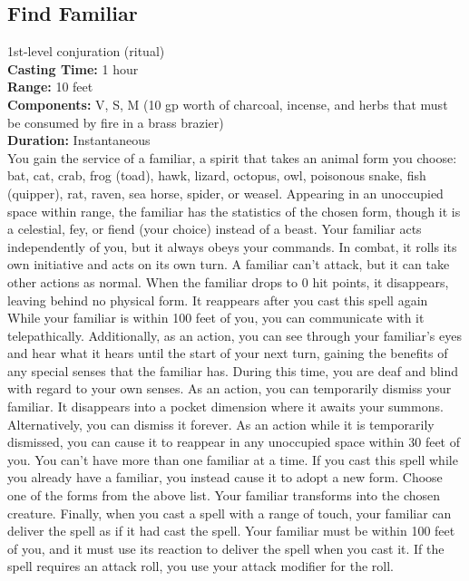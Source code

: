 \documentclass[11pt, A4paper, english]{article}
\begin{document}
		\subsection{Find Familiar}
1st-level conjuration (ritual) \\
\textbf{Casting Time:} 1 hour \\
\textbf{Range:} 10 feet \\
\textbf{Components:} V, S, M (10 gp worth of charcoal, incense, and herbs that must be consumed by fire in a brass brazier) \\
\textbf{Duration:} Instantaneous \\
You gain the service of a familiar, a spirit that takes an animal form you choose: bat, cat, crab, frog (toad), hawk, lizard, octopus, owl, poisonous snake, fish (quipper), rat, raven, sea horse, spider, or weasel. Appearing in an unoccupied space within range, the familiar has the statistics of the chosen form, though it is a celestial, fey, or fiend (your choice) instead of a beast. Your familiar acts independently of you, but it always obeys your commands. In combat, it rolls its own initiative and acts on its own turn. A familiar can’t attack, but it can take other actions as normal. When the familiar drops to 0 hit points, it disappears, leaving behind no physical form. It reappears after you cast this spell again While your familiar is within  100 feet of you, you can communicate with it telepathically. Additionally, as an action, you can see through your familiar’s eyes and hear what it hears until the start of your next turn, gaining the benefits of any special senses that the familiar has. During this time, you are deaf and blind with regard to your own senses. As an action, you can temporarily dismiss your familiar. It disappears into a pocket dimension where it awaits your summons. Alternatively, you can dismiss it forever. As an action while it is temporarily dismissed, you can cause it to reappear in any unoccupied space within 30 feet of you. You can’t have more than one familiar at a time. If you cast this spell while you already have a familiar, you instead cause it to adopt a new form. Choose one of the forms from the above list. Your familiar transforms into the chosen creature. Finally, when you cast a spell with a range of touch, your familiar can deliver the spell as if it had cast the spell. Your familiar must be within  100 feet of you, and it must use its reaction to deliver the spell when you cast it. If the spell requires an attack roll, you use your attack modifier for the roll.
\end{document}
